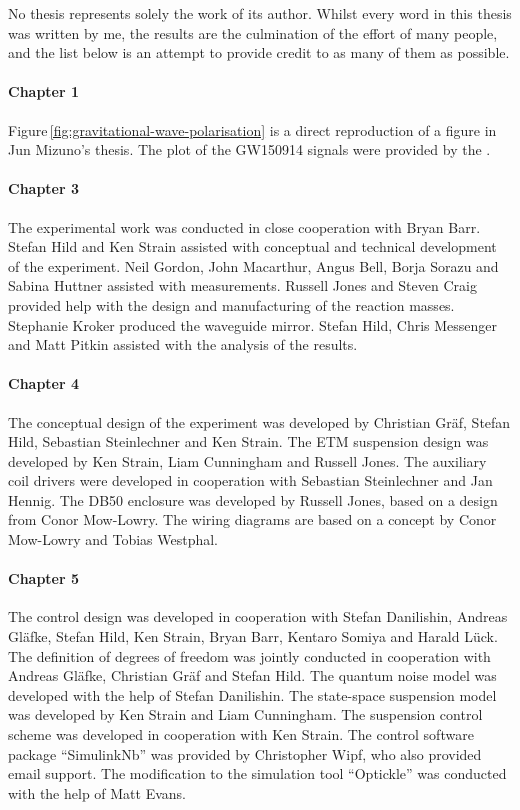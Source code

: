 No thesis represents solely the work of its author. Whilst every word in this thesis was written by me, the results are the culmination of the effort of many people, and the list below is an attempt to provide credit to as many of them as possible.

\paragraph{Chapter 1}
Figure\,\ref{fig:gravitational-wave-polarisation} is a direct reproduction of a figure in Jun Mizuno's thesis. The plot of the GW150914 signals were provided by the \LSC{}.

\paragraph{Chapter 3}
The experimental work was conducted in close cooperation with Bryan Barr. Stefan Hild and Ken Strain assisted with conceptual and technical development of the experiment. Neil Gordon, John Macarthur, Angus Bell, Borja Sorazu and Sabina Huttner assisted with measurements. Russell Jones and Steven Craig provided help with the design and manufacturing of the reaction masses. Stephanie Kroker produced the waveguide mirror. Stefan Hild, Chris Messenger and Matt Pitkin assisted with the analysis of the results.

\paragraph{Chapter 4}
The conceptual design of the experiment was developed by Christian Gr\"{a}f, Stefan Hild, Sebastian Steinlechner and Ken Strain. The ETM suspension design was developed by Ken Strain, Liam Cunningham and Russell Jones. The auxiliary coil drivers were developed in cooperation with Sebastian Steinlechner and Jan Hennig. The DB50 enclosure was developed by Russell Jones, based on a design from Conor Mow-Lowry. The wiring diagrams are based on a concept by Conor Mow-Lowry and Tobias Westphal.

\paragraph{Chapter 5}
The control design was developed in cooperation with Stefan Danilishin, Andreas Gl\"{a}fke, Stefan Hild, Ken Strain, Bryan Barr, Kentaro Somiya and Harald L\"{u}ck. The definition of degrees of freedom was jointly conducted in cooperation with Andreas Gl\"{a}fke, Christian Gr\"{a}f and Stefan Hild. The quantum noise model was developed with the help of Stefan Danilishin. The state-space suspension model was developed by Ken Strain and Liam Cunningham. The suspension control scheme was developed in cooperation with Ken Strain. The control software package ``SimulinkNb'' was provided by Christopher Wipf, who also provided email support. The modification to the simulation tool ``Optickle'' was conducted with the help of Matt Evans.

